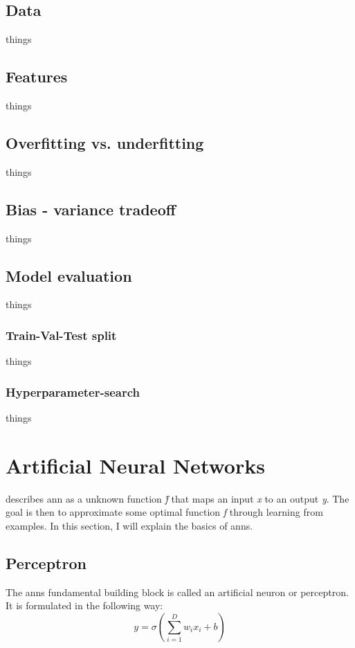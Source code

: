     \subsection{Data}
        things
    \subsection{Features}
        things
    \subsection{Overfitting vs. underfitting}
        things
    \subsection{Bias - variance tradeoff}
        things
    \subsection{Model evaluation}
        things
    \subsubsection{Train-Val-Test split}
        things
    \subsubsection{Hyperparameter-search}
        things

\section{Artificial Neural Networks} \label{neural networks}
    \citeauthor{Goodfellow-et-al-2016_NN} \cite{Goodfellow-et-al-2016_NN} describes \gls{ann} as a unknown function \textit{\^{f}} that maps an input \textit{x} to an output \textit{y}. The goal is then to approximate some optimal function \textit{f} through learning from examples. In this section, I will explain the basics of \gls{ann}s.

    \subsection{Perceptron} \label{perceptron}
        The \gls{ann}s fundamental building block is called an artificial neuron or perceptron. It is formulated in the following way\cite{razavi2021deep_exp_per}:
            \begin{equation} \label{eq_perceptron}
                y = \sigma(\sum_{i=1}^{D}w_ix_i + b)
            \end{equation}
            
